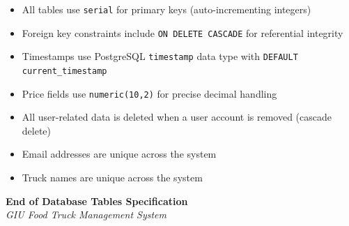 \documentclass[11pt]{article}
\begin{document}
\begin{tcolorbox}[colback=lightgray, colframe=darkgray, boxrule=1pt, arc=2mm, left=3mm]
\begin{itemize}[leftmargin=1cm]
    \item All tables use \texttt{serial} for primary keys (auto-incrementing integers)
    \item Foreign key constraints include \texttt{ON DELETE CASCADE} for referential integrity
    \item Timestamps use PostgreSQL \texttt{timestamp} data type with \texttt{DEFAULT current\_timestamp}
    \item Price fields use \texttt{numeric(10,2)} for precise decimal handling
    \item All user-related data is deleted when a user account is removed (cascade delete)
    \item Email addresses are unique across the system
    \item Truck names are unique across the system
\end{itemize}
\end{tcolorbox}

\vspace{0.5cm}

\begin{center}
\begin{tcolorbox}[colback=primaryblue!10, colframe=primaryblue, boxrule=1.5pt, arc=3mm, width=0.9\textwidth]
\centering
\large\textbf{\color{darkgray}End of Database Tables Specification}\\
\vspace{0.2cm}
\normalsize\textit{GIU Food Truck Management System}
\end{tcolorbox}
\end{center}
\end{document}
